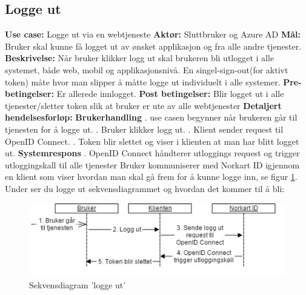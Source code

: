 \subsection{Logge ut}
\label{subsec:use_case_logge_ut}
\newline \textbf{Use case:} Logge ut via en webtjeneste
\newline \textbf{Aktør:}	Sluttbruker og Azure AD
\newline \textbf{Mål:} Bruker skal kunne få logget ut av ønsket applikasjon og fra alle andre tjenester.
\newline \textbf{Beskrivelse:} Når bruker klikker logg ut skal brukeren bli utlogget i alle systemet, både web, mobil og applikasjonsnivå. En singel-sign-out(for aktivt token) måte hvor man slipper å måtte logge ut individuelt i alle systemer.
\newline \textbf{Pre-betingelser:} Er allerede innlogget.
\newline \textbf{Post betingelser:} Blir logget ut i alle tjenester/sletter token slik at bruker er ute av alle webtjenester
\newline \textbf{Detaljert hendelsesforløp:}
\newline
\newline \textbf{Brukerhandling}
. use casen begynner når brukeren går til tjenesten for å logge ut.
. Bruker klikker logg ut.
. Klient sender request til OpenID Connect.
. Token blir slettet og viser i klienten at man har blitt logget ut.
\newline
\newline \textbf{Systemrespons}
. OpenID Connect håndterer utloggings request og trigger utloggingskall til alle tjenester
\newline
\newline
Bruker kommuniserer med Norkart ID igjennom en klient som viser hvordan man skal gå frem for å kunne logge inn, se figur \ref{fig:skevensdiagramLoggUt}. Under ser du logge ut sekvensdiagrammet og hvordan det kommer til å bli:
\newline

\begin{figure}[H]
    \centering
    \includegraphics[scale=0.55]{graphics/04-arkitektur/UseCaseSekveknsdiagramLoggeUt.jpg}
    \caption{Sekvensdiagram 'logge ut'}
    \label{fig:skevensdiagramLoggUt}
\end{figure}

